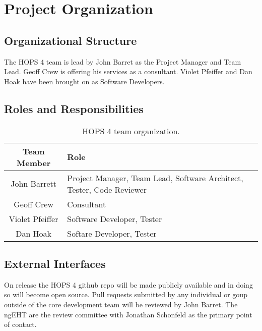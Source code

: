 %
%
\section{Project Organization}
\label{sec:projectorganization}

\subsection{Organizational Structure}
The HOPS 4 team is lead by John Barret as the Project Manager and Team Lead. Geoff Crew is offering his services as a consultant. 
Violet Pfeiffer and Dan Hoak have been brought on as Software Developers. 

\subsection{Roles and Responsibilities}
\begin{table}[h!]
\centering
 \begin{tabular}{c | >{\centering\arraybackslash}p{8cm}} 
 Team Member & Role \\ [0.5ex] 
 \hline%
 John Barrett & Project Manager, Team Lead, Software Architect, Tester, Code Reviewer \\ 
 Geoff Crew & Consultant \\
 Violet Pfeiffer & Software Developer, Tester \\ 
 Dan Hoak & Softare Developer, Tester \\ [1ex]
 \end{tabular}
 \caption{HOPS 4 team organization.}
 \label{table:2}
\end{table}

\subsection{External Interfaces}
On release the HOPS 4 github repo will be made publicly available and in doing so will become open source.
Pull requests submitted by any individual or goup outside of the core development team will be reviewed by John Barret.
The ngEHT are the review committee with Jonathan Schonfeld as the primary point of contact.
%
%

